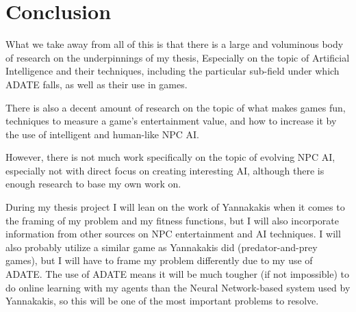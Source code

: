 \documentclass[]{report}
\begin{document}
\chapter{Conclusion}
\label{cha:conclusion}

What we take away from all of this is that there is a large and voluminous
body of research on the underpinnings of my thesis, Especially on the topic of
Artificial Intelligence and their techniques, including the particular sub-field
under which ADATE falls, as well as their use in games.

There is also a decent amount of research on the topic of what makes games fun,
techniques to measure a game's entertainment value, and how to increase it by
the use of intelligent and human-like NPC AI.

However, there is not much work specifically on the topic of evolving NPC AI,
especially not with direct focus on creating interesting AI, although there is
enough research to base my own work on.

During my thesis project I will lean on the work of Yannakakis
\citep{yannakakis2005ai} when it comes to the framing of my problem and my
fitness functions, but I will also incorporate information from other sources on
NPC entertainment and AI techniques. I will also probably utilize a similar game
as Yannakakis did (predator-and-prey games), but I will have to frame my problem
differently due to my use of ADATE. The use of ADATE means it will be much
tougher (if not impossible) to do online learning with my agents than the Neural
Network-based system used by Yannakakis, so this will be one of the most
important problems to resolve.



\end{document}
